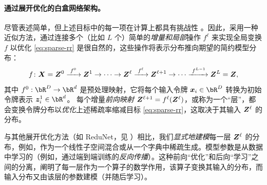 \documentclass[../../book-main.tex]{subfiles}
\begin{document}
\paragraph{通过展开优化的白盒网络架构。}


尽管表述简单，但上述目标中的每一项在计算上都具有挑战性 \cite{Wright-Ma-2022}。因此，采用一种近似方法，通过连接多个（比如 $L$ 个）简单的\textit{增量和局部}操作 $f^\ell$ 来实现全局变换 $f$ 以优化 \eqref{eq:sparse-rr} 是很自然的，这些操作将表示分布推向期望的简约模型分布：
\begin{equation}
f\colon \bm{X} = \bm Z^0 \xrightarrow{\hspace{1mm} f^0 \hspace{1mm}} \bm{Z}^1 \rightarrow \cdots \rightarrow \bm{Z}^\ell \xrightarrow{\hspace{1mm} f^{\ell} \hspace{1mm}} \bm{Z}^{\ell+1} \rightarrow  \cdots \xrightarrow{\hspace{1mm} f^{L-1}} \bm{Z}^L = \bm{Z},
\label{eq:incremental}
\end{equation}
其中 $f^0: \bR^{D} \rightarrow \bR^{d}$ 是预处理映射，它将每个输入令牌 $\x_{i} \in \bR^{D}$ 转换为初始令牌表示 $\z_{i}^{1} \in \bR^{d}$。
每个增量\textit{前向映射} $\bm{Z}^{\ell + 1} = f^\ell(\bm{Z}^\ell)$，或称为一个“层”，都会变换令牌分布以\textit{优化}上述稀疏率缩减目标 \eqref{eq:sparse-rr}，这取决于其输入 $\bm{Z}^\ell$ 的分布。

\begin{remark}
    与其他展开优化方法（如 ReduNet，见 ）相比，我们\textit{显式地建模}每一层 $\bm{Z}^\ell$ 的分布，例如，作为一个线性子空间混合或从一个字典中稀疏生成。模型参数是从数据中学习的（例如，通过端到端训练的\textit{反向传播}）。这种前向“优化”和后向“学习”之间的分离，阐明了每一层作为一个算子的数学作用，该算子变换其输入的分布，而输入分布又由该层的参数建模（并随后学习）。
\end{remark}
\end{document}
